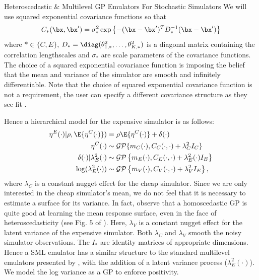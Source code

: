 \begin{chapter}{Heteroscedastic \& Multilevel GP Emulators For Stochastic Simulators\label{Ch:Hetsml}}
We will use squared exponential covariance functions so that
\begin{align}
	C_{*}(\bx, \bx') =  \sigma^2_{*} \exp\left\{ -(\bx - \bx')^T D^{-1}_{*}(\bx -  \bx')\right\}\nonumber
\end{align}
\noindent where $* \in \{C, E\}$, $D_{*} = \diag(\theta_{1, *}^2, \ldots, \theta_{K, *}^2)$ is a diagonal matrix containing the correlation lengthscales and $\sigma_*$ are scale parameters of the covariance functions. The choice of a squared exponential covariance function is imposing the belief that the mean and variance of the simulator are smooth and infinitely differentiable. Note that the choice  of squared exponential covariance function is not a requirement, the user can specify a different covariance structure as they see fit \citep{Rasmussen2006}.


Hence a hierarchical model for the expensive simulator is as follows:
\begin{align*}
	\eta^E(\cdot) | \rho, \E\{ \eta^C(\cdot) \}) & = \rho \E\{ \eta^C(\cdot) \} + \delta(\cdot)\nonumber \\
	\eta^C(\cdot)  & \sim \mathcal{GP} \{ m_C(\cdot), C_C(\cdot, \cdot) + \lambda^2_C I_C\}\nonumber\\
	\delta(\cdot)|\lambda_E^2(\cdot) & \sim  \mathcal{GP} \left\{ m_E(\cdot), C_E(\cdot, \cdot) + \lambda^2_E(\cdot) I_E  \right\}\nonumber \\
	\log(\lambda_E^2(\cdot)) &  \sim \mathcal{GP} \left\{ m_V(\cdot), C_V (\cdot, \cdot) + \lambda_{V}^2 I_E \right\},\nonumber
\end{align*}
where $\lambda_C$ is a constant nugget effect for the cheap simulator. Since we are only interested in the cheap simulator's mean, we do not feel that it is necessary to estimate a surface for its variance. In fact, \citet{Binois2019} observe that a homoscedastic GP is quite good at learning the mean response surface, even in the face of heteroscedasticity (see Fig. $5$ of \citep{Binois2019}). Here, $\lambda_{V}$ is a constant nugget effect for the latent variance of the expensive simulator. Both $\lambda_C$ and $\lambda_V$  smooth the noisy simulator observations. The $I_{*}$ are identity matrices of appropriate dimensions. Hence a SML emulator has a similar structure to the standard multilevel emulators presented by \cite{Kennedy2000}, with the addition of a latent variance process ($\lambda_E^2(\cdot)$). We model the log variance as a GP to enforce positivity.


\end{chapter}
